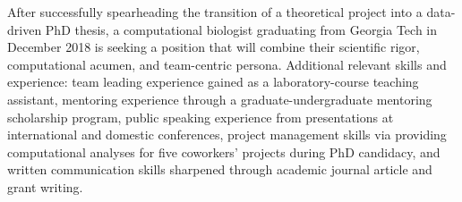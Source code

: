 

\begin{cventries}


\fontsize{10pt}{1em}\bodyfontlight\upshape\color{black}\justify
After successfully spearheading the transition of a theoretical project into a data-driven PhD thesis, a computational biologist graduating from Georgia Tech in December 2018 is seeking a position that will combine their scientific rigor, computational acumen, and team-centric persona. Additional relevant skills and experience: team leading experience gained as a laboratory-course teaching assistant, mentoring experience through a graduate-undergraduate mentoring scholarship program, public speaking experience from presentations at international and domestic conferences, project management skills via providing computational analyses for five coworkers' projects during PhD candidacy, and written communication skills sharpened through academic journal article and grant writing.
    
\vspace{-2.0mm}
\end{cventries}
